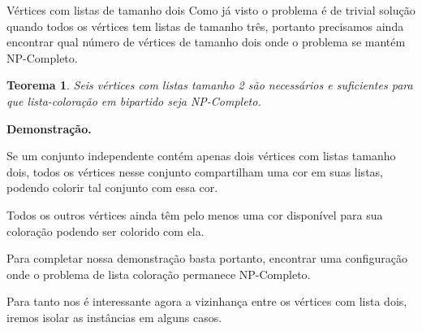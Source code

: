 \documentclass[9pt, compress]{beamer}
\newtheorem{teorema}{Teorema}
\newcommand{\?}{\textcolor{warn}{\textit{?}}}
\begin{document}
     \begin{frame}{Vértices com listas de tamanho dois}
       Como já visto o problema é de trivial solução quando todos os vértices tem listas de tamanho três, portanto precisamos ainda encontrar qual número de vértices de tamanho dois onde o problema se mantém NP-Completo.
       \begin{teorema}
         Seis vértices com listas tamanho 2 são necessários e suficientes para que lista-coloração em bipartido seja NP-Completo.
       \end{teorema}
       \textbf{Demonstração.}
       
 
       Se um conjunto independente contém apenas dois vértices com listas tamanho dois, todos os vértices nesse conjunto compartilham uma cor em suas listas, podendo colorir tal conjunto com essa cor.
       
        Todos os outros vértices ainda têm pelo menos uma cor disponível para sua coloração podendo ser colorido com ela. 
       
       Para completar nossa demonstração basta portanto, encontrar uma configuração onde o problema de lista coloração permanece NP-Completo.
 
       Para tanto nos é interessante agora a vizinhança entre os vértices com lista dois, iremos isolar as instâncias em alguns casos.  
       
     \end{frame}
     
\end{document}
